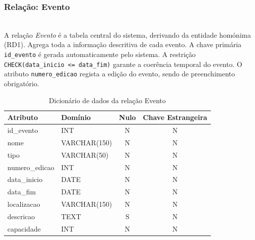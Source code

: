 \documentclass[runningheads]{llncs}
\begin{document}
                \vspace{0.3cm}
                \noindent\begin{minipage}{\textwidth}
                \subsubsection{Relação: Evento}\mbox{}\\

                A relação \textit{Evento} é a tabela central do sistema, derivando da entidade
                homónima (RD1). Agrega toda a informação descritiva de cada evento. A chave
                primária \texttt{id\_evento} é gerada automaticamente pelo sistema. A restrição
                \texttt{CHECK(data\_inicio <= data\_fim)} garante a coerência temporal do evento.
                O atributo \texttt{numero\_edicao} regista a edição do evento, sendo de preenchimento obrigatório.

                \begin{table}[H]
                \centering
                \renewcommand{\arraystretch}{1.4}
                \begin{tabular}{|l|l|c|c|}
                \hline
                \textbf{Atributo} & \textbf{Domínio} & \textbf{Nulo} & \textbf{Chave Estrangeira} \\ \hline
                id\_evento   & INT          & N & N \\ \hline
                nome         & VARCHAR(150) & N & N \\ \hline
                tipo         & VARCHAR(50)  & N & N \\ \hline
                numero\_edicao & INT          & N & N \\ \hline
                data\_inicio & DATE         & N & N \\ \hline
                data\_fim    & DATE         & N & N \\ \hline
                localizacao  & VARCHAR(150) & N & N \\ \hline
                descricao    & TEXT         & S & N \\ \hline
                capacidade   & INT          & N & N \\ \hline
                \end{tabular}
                \vspace{0.2cm}
                \caption{Dicionário de dados da relação Evento}
                \label{tab:dic_evento}
                \end{table}
                \end{minipage}
\end{document}

